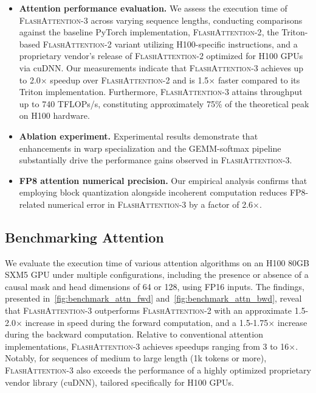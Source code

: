 \begin{itemize}

\item \textbf{Attention performance evaluation.} We assess the execution time of \textsc{FlashAttention-3} across varying sequence lengths, conducting comparisons against the baseline PyTorch implementation, \textsc{FlashAttention-2}, the Triton-based \textsc{FlashAttention-2} variant utilizing H100-specific instructions, and a proprietary vendor’s release of \textsc{FlashAttention-2} optimized for H100 GPUs via cuDNN. Our measurements indicate that \textsc{FlashAttention-3} achieves up to 2.0$\times$ speedup over \textsc{FlashAttention-2} and is 1.5$\times$ faster compared to its Triton implementation. Furthermore, \textsc{FlashAttention-3} attains throughput up to 740 TFLOPs/s, constituting approximately 75\% of the theoretical peak on H100 hardware.
\item \textbf{Ablation experiment.} Experimental results demonstrate that enhancements in warp specialization and the GEMM-softmax pipeline substantially drive the performance gains observed in \textsc{FlashAttention-3}.
\item \textbf{FP8 attention numerical precision.} Our empirical analysis confirms that employing block quantization alongside incoherent computation reduces FP8-related numerical error in \textsc{FlashAttention-3} by a factor of 2.6$\times$.
\end{itemize}

\subsection{Benchmarking Attention}
\label{subsec:benchmark_attn}

We evaluate the execution time of various attention algorithms on an H100 80GB SXM5 GPU under multiple configurations, including the presence or absence of a causal mask and head dimensions of 64 or 128, using FP16 inputs. The findings, presented in~\cref{fig:benchmark_attn_fwd} and~\cref{fig:benchmark_attn_bwd}, reveal that \textsc{FlashAttention-3} outperforms \textsc{FlashAttention-2} with an approximate 1.5-2.0$\times$ increase in speed during the forward computation, and a 1.5-1.75$\times$ increase during the backward computation. Relative to conventional attention implementations, \textsc{FlashAttention-3} achieves speedups ranging from 3 to 16$\times$. Notably, for sequences of medium to large length (1k tokens or more), \textsc{FlashAttention-3} also exceeds the performance of a highly optimized proprietary vendor library (cuDNN), tailored specifically for H100 GPUs.


